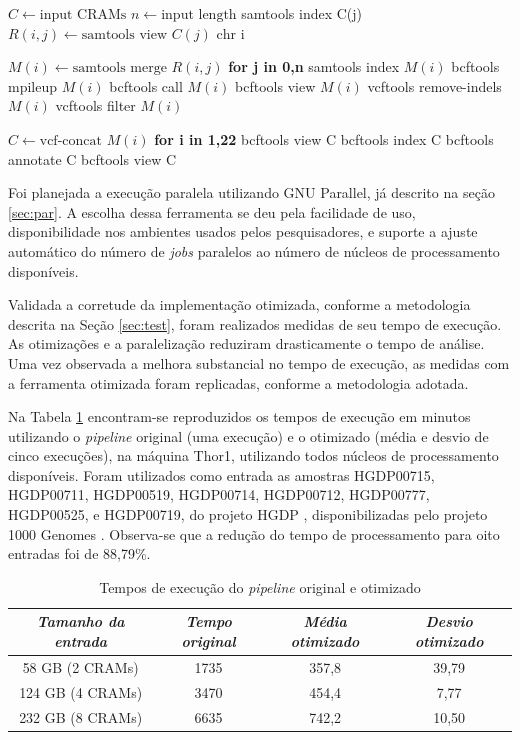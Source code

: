 \documentclass[cic,tc]{iiufrgs}
\begin{document}
\begin{algorithmic}
  \State $C \gets \text{input CRAMs}$
  \State $n \gets \text{input length}$
  \State samtools index C(j)
    \State $R(i,j) \gets \text{samtools view } C(j) \text{ chr i}$
  \EndFor
\EndFor

  \State $M(i) \gets \text{samtools merge } R(i,j)$ \textbf{for j in 0,n}
  \State samtools index $M(i)$
  \State bcftools mpileup $M(i)$
  \State bcftools call $M(i)$
  \State bcftools view $M(i)$
  \State vcftools remove-indels $M(i)$
  \State vcftools filter $M(i)$
\EndFor

\State $C \gets \text{vcf-concat } M(i)$ \textbf{for i in 1,22}
\State bcftools view C
\State bcftools index C
\State bcftools annotate C
\State bcftools view C
\end{algorithmic}

Foi planejada a execução paralela utilizando GNU Parallel, já descrito na seção
\ref{sec:par}. A escolha dessa ferramenta se deu pela facilidade de uso,
disponibilidade nos ambientes usados pelos pesquisadores, e suporte a ajuste
automático do número de \textit{jobs} paralelos ao número de núcleos de
processamento disponíveis. 

Validada a corretude da implementação otimizada, conforme a metodologia
descrita na Seção \ref{sec:test}, foram realizados medidas de seu tempo de
execução. As otimizações e a paralelização reduziram drasticamente o tempo de
análise. Uma vez observada a melhora substancial no tempo de execução, as
medidas com a ferramenta otimizada foram replicadas, conforme a metodologia
adotada. 

Na Tabela \ref{tbl:SAMtools} encontram-se reproduzidos os tempos de execução em
minutos utilizando o \textit{pipeline} original (uma execução) e o otimizado
(média e desvio de cinco execuções), na máquina Thor1, utilizando todos núcleos
de processamento disponíveis. Foram utilizados como entrada as amostras
HGDP00715, HGDP00711, HGDP00519, HGDP00714, HGDP00712, HGDP00777, HGDP00525, e
HGDP00719, do projeto HGDP \cite{cavalli2005human}, disponibilizadas pelo
projeto 1000 Genomes \cite{via20101000}. Observa-se que a redução do tempo de
processamento para oito entradas foi de 88,79\%.

\begin{table}[h]
    \caption{Tempos de execução do \textit{pipeline} original e otimizado}
    \centering
        \begin{tabular}{c|c|c|c}
          \hline
          \textit{Tamanho da entrada}  &   \textit{Tempo original}  & \textit{Média otimizado} & \textit{Desvio otimizado} \\
          \hline
          \hline
          58 GB (2 CRAMs)  & 1735 & 357,8 & 39,79  \\
          124 GB (4 CRAMs) & 3470 & 454,4 & 7,77   \\
          232 GB (8 CRAMs) & 6635 & 742,2 &  10,50 \\
          \hline
        \end{tabular}
    \label{tbl:SAMtools}
\end{table}
\end{document}

